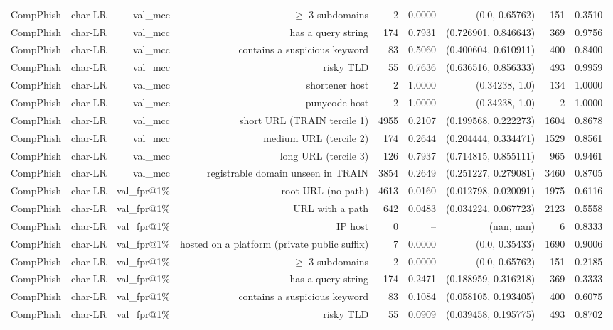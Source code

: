 \begin{table}[t]
\begin{tabular}{llrrrrrrr}
CompPhish & char-LR & val\_mcc & $\geq$ 3 subdomains & 2 & 0.0000 & (0.0, 0.65762) & 151 & 0.3510 \\
CompPhish & char-LR & val\_mcc & has a query string & 174 & 0.7931 & (0.726901, 0.846643) & 369 & 0.9756 \\
CompPhish & char-LR & val\_mcc & contains a suspicious keyword & 83 & 0.5060 & (0.400604, 0.610911) & 400 & 0.8400 \\
CompPhish & char-LR & val\_mcc & risky TLD & 55 & 0.7636 & (0.636516, 0.856333) & 493 & 0.9959 \\
CompPhish & char-LR & val\_mcc & shortener host & 2 & 1.0000 & (0.34238, 1.0) & 134 & 1.0000 \\
CompPhish & char-LR & val\_mcc & punycode host & 2 & 1.0000 & (0.34238, 1.0) & 2 & 1.0000 \\
CompPhish & char-LR & val\_mcc & short URL (TRAIN tercile 1) & 4955 & 0.2107 & (0.199568, 0.222273) & 1604 & 0.8678 \\
CompPhish & char-LR & val\_mcc & medium URL (tercile 2) & 174 & 0.2644 & (0.204444, 0.334471) & 1529 & 0.8561 \\
CompPhish & char-LR & val\_mcc & long URL (tercile 3) & 126 & 0.7937 & (0.714815, 0.855111) & 965 & 0.9461 \\
CompPhish & char-LR & val\_mcc & registrable domain unseen in TRAIN & 3854 & 0.2649 & (0.251227, 0.279081) & 3460 & 0.8705 \\
CompPhish & char-LR & val\_fpr@1\% & root URL (no path) & 4613 & 0.0160 & (0.012798, 0.020091) & 1975 & 0.6116 \\
CompPhish & char-LR & val\_fpr@1\% & URL with a path & 642 & 0.0483 & (0.034224, 0.067723) & 2123 & 0.5558 \\
CompPhish & char-LR & val\_fpr@1\% & IP host & 0 & -- & (nan, nan) & 6 & 0.8333 \\
CompPhish & char-LR & val\_fpr@1\% & hosted on a platform (private public suffix) & 7 & 0.0000 & (0.0, 0.35433) & 1690 & 0.9006 \\
CompPhish & char-LR & val\_fpr@1\% & $\geq$ 3 subdomains & 2 & 0.0000 & (0.0, 0.65762) & 151 & 0.2185 \\
CompPhish & char-LR & val\_fpr@1\% & has a query string & 174 & 0.2471 & (0.188959, 0.316218) & 369 & 0.3333 \\
CompPhish & char-LR & val\_fpr@1\% & contains a suspicious keyword & 83 & 0.1084 & (0.058105, 0.193405) & 400 & 0.6075 \\
CompPhish & char-LR & val\_fpr@1\% & risky TLD & 55 & 0.0909 & (0.039458, 0.195775) & 493 & 0.8702 \\

\end{tabular}
\end{table}
